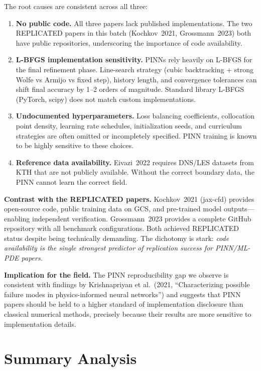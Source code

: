 \documentclass[11pt]{article}
\begin{document}
The root causes are consistent across all three:
\begin{enumerate}[leftmargin=1.4em,itemsep=0.2em,topsep=0.2em]
\item \textbf{No public code.} All three papers lack published implementations.
  The two REPLICATED papers in this batch (Kochkov~2021, Grossmann~2023) both
  have public repositories, underscoring the importance of code availability.
\item \textbf{L-BFGS implementation sensitivity.} PINNs rely heavily on L-BFGS
  for the final refinement phase. Line-search strategy (cubic backtracking +
  strong Wolfe vs Armijo vs fixed step), history length, and convergence
  tolerances can shift final accuracy by 1--2 orders of magnitude. Standard
  library L-BFGS (PyTorch, scipy) does not match custom implementations.
\item \textbf{Undocumented hyperparameters.} Loss balancing coefficients,
  collocation point density, learning rate schedules, initialization seeds,
  and curriculum strategies are often omitted or incompletely specified. PINN
  training is known to be highly sensitive to these choices.
\item \textbf{Reference data availability.} Eivazi~2022 requires DNS/LES
  datasets from KTH that are not publicly available. Without the correct
  boundary data, the PINN cannot learn the correct field.
\end{enumerate}

\noindent\textbf{Contrast with the REPLICATED papers.} Kochkov~2021
(jax-cfd) provides open-source code, public training data on GCS, and
pre-trained model outputs---enabling independent verification. Grossmann~2023
provides a complete GitHub repository with all benchmark configurations.
Both achieved REPLICATED status despite being technically demanding. The
dichotomy is stark: \emph{code availability is the single strongest predictor
of replication success for PINN/ML-PDE papers.}

\noindent\textbf{Implication for the field.} The PINN reproducibility gap we
observe is consistent with findings by Krishnapriyan et al.\ (2021,
``Characterizing possible failure modes in physics-informed neural
networks'') and suggests that PINN papers should be held to a higher
standard of implementation disclosure than classical numerical methods,
precisely because their results are more sensitive to implementation
details.


\clearpage
\section{Summary Analysis}
\end{document}
